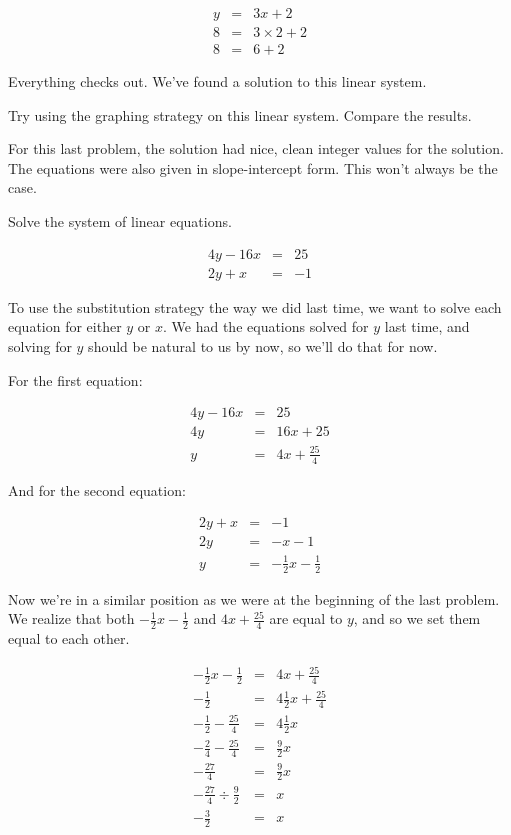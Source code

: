 $$\begin{array}{rcl}
y & = & 3x + 2 \\
8 & = & 3\times 2 + 2\\
8 & = & 6 + 2 \end{array}$$

Everything checks out.  We've found a solution to this linear system.

\begin{prblm}
Try using the graphing strategy on this linear system.  Compare the results.
\end{prblm}

For this last problem, the solution had nice, clean integer values for the solution.  The equations were also given in slope-intercept form.  This won't always be the case.

\begin{example}
Solve the system of linear equations.

$$\begin{array}{rcl}
4y - 16x & = & 25 \\
2y + x & = & -1 \end{array}$$

To use the substitution strategy the way we did last time, we want to solve each equation for either $y$ or $x$.  We had the equations solved for $y$ last time, and solving for $y$ should be natural to us by now, so we'll do that for now.

For the first equation:

$$\begin{array}{rcl}
4y - 16x & = & 25 \\
4y & = & 16x + 25 \\
y & = & 4x + \frac{25}{4} \end{array}$$

And for the second equation:

$$\begin{array}{rcl}
2y + x & = & -1 \\
2y & = & -x -1 \\
y & = & -\frac{1}{2}x - \frac{1}{2} \end{array}$$

Now we're in a similar position as we were at the beginning of the last problem.  We realize that both $-\frac{1}{2}x - \frac{1}{2}$ and $4x + \frac{25}{4}$ are equal to $y$, and so we set them equal to each other.

$$\begin{array}{rcl}
-\frac{1}{2}x - \frac{1}{2} & = & 4x + \frac{25}{4}\\
-\frac{1}{2} & = & 4\frac{1}{2}x + \frac{25}{4}\\
-\frac{1}{2} - \frac{25}{4} & = & 4\frac{1}{2}x\\
-\frac{2}{4} - \frac{25}{4} & = & \frac{9}{2}x\\
-\frac{27}{4} & = & \frac{9}{2}x\\
-\frac{27}{4} \div \frac{9}{2} & = & x\\
-\frac{3}{2} & = & x\\
\end{array}$$


\end{example}

